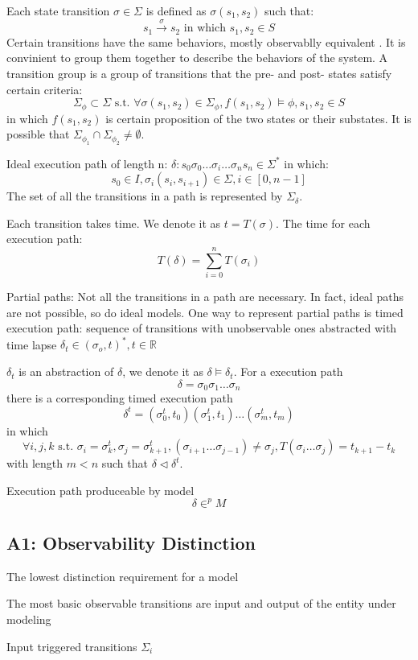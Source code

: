 \documentclass{llncs}
\begin{document}
Each state transition $\sigma\in\Sigma$ is defined as $\sigma(s_1,s_2)$ such that:
$$s_1\xrightarrow{\sigma}s_2\text{ in which }s_1,s_2\in S$$
Certain transitions have the same behaviors, mostly observablly equivalent . It is convinient to group them together to describe the behaviors of the system. A \textsf{transition group} is a group of transitions that the pre- and post- states satisfy certain criteria:
$$\Sigma_\phi\subset\Sigma \text{ s.t. }\forall\sigma(s_1,s_2)\in\Sigma_\phi,f(s_1,s_2)\models\phi,s_1,s_2\in S$$
in which $f(s_1,s_2)$ is certain proposition of the two states or their substates. It is possible that $\Sigma_{\phi_1}\cap\Sigma_{\phi_2}\neq \emptyset$.

Ideal execution path of length n: $\delta:s_0\sigma_0\dots\sigma_i\dots\sigma_ns_n\in\Sigma^*$ in which: 
$$s_0\in I, \sigma_i(s_i,s_{i+1})\in\Sigma, i\in[0,n-1]$$ 
The set of all the transitions in a path is represented by $\Sigma_\delta$.

Each transition takes time. We denote it as $t=T(\sigma)$. The time for each execution path: $$T(\delta)=\sum_{i=0}^nT(\sigma_i)$$

Partial paths: Not all the transitions in a path are necessary. In fact, ideal paths are not possible, so do ideal models. One way to represent partial paths is timed execution path: sequence of transitions with unobservable ones abstracted with time lapse $\delta_t\in(\sigma_o,t)^*, t\in \mathbb{R}$

$\delta_t$ is an abstraction of $\delta$, we denote it as $\delta\models\delta_t$. For a execution path 
$$\delta=\sigma_0\sigma_1\dots\sigma_n$$
there is a corresponding timed execution path 
$$\delta^t=(\sigma_0^t,t_0)(\sigma_1^t,t_1)\dots(\sigma_m^t,t_m)$$ 
in which
$$\forall i,j,k \text{ s.t. } \sigma_i=\sigma_k^t,\sigma_j=\sigma_{k+1}^t,(\sigma_{i+1}\dots\sigma_{j-1})\neq\sigma_{j},T(\sigma_i\dots\sigma_j)=t_{k+1}-t_k$$
with length $m<n$ such that $\delta\triangleleft\delta^t$. 

Execution path produceable by model
$$\delta\in^p M$$
\subsection{A1: Observability Distinction}
The lowest distinction requirement for a model

The most basic observable transitions are input and output of the entity under modeling

Input triggered transitions $\Sigma_i$
\end{document}
